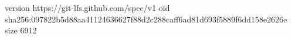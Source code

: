 version https://git-lfs.github.com/spec/v1
oid sha256:097822b5d88aa41124636627f88d2c288caff6ad81d693f5889f6dd158e2626e
size 6912
